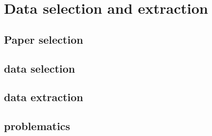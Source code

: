 \section{Data selection and extraction}
\subsection{Paper selection}

\subsection{data selection}

\subsection{data extraction}

\subsection{problematics}
